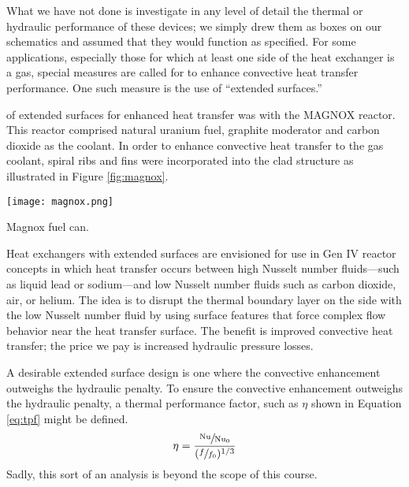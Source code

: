 What we have not done is investigate in any level of detail the thermal or hydraulic performance of these devices; we simply drew them as boxes on our schematics and assumed that they would function as specified. For some applications, especially those for which at least one side of the heat exchanger is a gas, special measures are called for to enhance convective heat transfer performance.  One such measure is the use of ``extended surfaces.''  

 of extended surfaces for enhanced heat transfer was with the MAGNOX reactor. This reactor comprised natural uranium fuel, graphite moderator and carbon dioxide as the coolant.  In order to enhance convective heat transfer to the gas coolant, spiral ribs and fins were incorporated into the clad structure as illustrated in Figure \ref{fig:magnox}.

\begin{marginfigure}
\texttt{[image: magnox.png]}
\caption{Magnox fuel can.}
\label{fig:magnox}
\end{marginfigure}

Heat exchangers with extended surfaces are envisioned for use in Gen IV reactor concepts in which heat transfer occurs between high Nusselt number fluids---such as liquid lead or sodium---and low Nusselt number fluids such as carbon dioxide, air, or helium. The idea is to disrupt the thermal boundary layer on the side with the low Nusselt number fluid by using surface features that force complex flow behavior near the heat transfer surface.  The benefit is improved convective heat transfer; the price we pay is increased hydraulic pressure losses.  

A desirable extended surface design is one where the convective enhancement outweighs the hydraulic penalty. To ensure the convective enhancement outweighs the hydraulic penalty, a thermal performance factor\cite{maradiya2018heat}, such as $\eta$ shown in Equation \ref{eq:tpf} might be defined.
\begin{equation}
\eta = \frac{\sfrac{\text{Nu}}{\text{Nu}_0}}{(\sfrac{f}{f_0})^{1/3}}
\label{eq:tpf}
\end{equation}
Sadly, this sort of an analysis is beyond the scope of this course.


